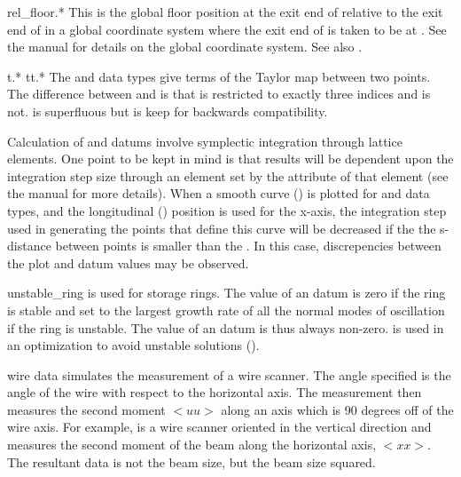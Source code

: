 \begin{description}
  \item{rel\_floor.*}
This is the global floor position at the exit end of  relative
to the exit end of  in a global coordinate system where the
exit end of  is taken to be at . See the \bmad manual for details on the global coordinate
system. See also .

  \item{t.* tt.*} \Newline
The  and  data types give terms of the Taylor map between
two points. The difference between  and  is that
 is restricted to exactly three indices and  is
not.  is superfluous but is keep for backwards compatibility.

Calculation of  and  datums involve symplectic integration
through lattice elements. One point to be kept in mind is that results
will be dependent upon the integration step size through an element
set by the  attribute of that element (see the \bmad
manual for more details). When a smooth curve () is
plotted for  and  data types, and the longitudinal
() position is used for the x-axis, the integration step used
in generating the points that define this curve will be decreased if
the the s-distance between points is smaller than the .
In this case, discrepencies between the plot and datum values may be observed.

  \item{unstable\_ring} \Newline
{} is used for storage rings. The value of an
 datum is zero if the ring is stable and set to the
largest growth rate of all the normal modes of oscillation if the ring
is unstable. The value of an  datum is thus always
non-zero.   is used in an optimization to avoid
unstable solutions ().

  \item{wire} \Newline
{} data simulates the measurement of a wire scanner. The angle specified
is the angle of the wire with respect to the horizontal axis. The measurement
then measures the second moment $<uu>$ along an axis which is 90 degrees off of
the wire axis. For example,  is a wire scanner oriented in the
vertical direction and measures the second moment of the beam along the
horizontal axis, $<xx>$. The resultant data is not the beam size, but the beam
size squared.

  \end{description}



